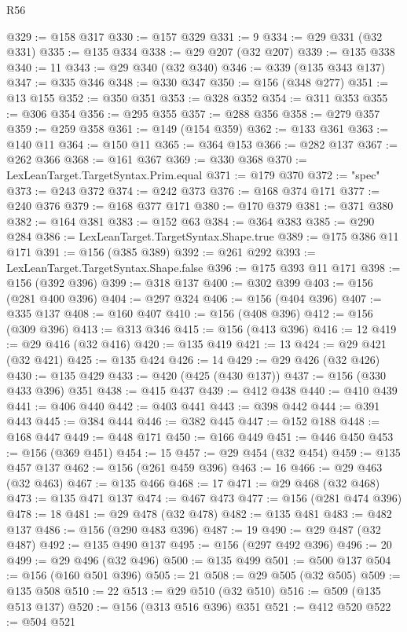 \begin{lexlean}{R56}
\begin{coremodule}
{{{{{{{{{{{{{{{{{{{{{{{{{{{{{{{{{{{{{{{{{{{{{{{{{{{{{{{{{{{{{{{{{{{{{{{{{{{{{{{{{{{{{{{{{{{{{{{{{{{{{{{{{{{{{{{{{{{{{{{{{{{{{{{{{{{{{{{{{{{{{{{{{{{{{{{{{{{{{{{{{{{{{{{{{{{{{{{{{{{{{{{{{{{{{{{{{{{{{{{{{{{{{{{{{{{@329 := @158 @317
@330 := @157 @329
@331 := 9
@334 := @29 @331 (@32 @331)
@335 := @135 @334
@338 := @29 @207 (@32 @207)
@339 := @135 @338
@340 := 11
@343 := @29 @340 (@32 @340)
@346 := @339 (@135 @343 @137)
@347 := @335 @346
@348 := @330 @347
@350 := @156 (@348 @277)
@351 := @13 @155
@352 := @350 @351
@353 := @328 @352
@354 := @311 @353
@355 := @306 @354
@356 := @295 @355
@357 := @288 @356
@358 := @279 @357
@359 := @259 @358
@361 := @149 (@154 @359)
@362 := @133 @361
@363 := @140 @11
@364 := @150 @11
@365 := @364 @153
@366 := @282 @137
@367 := @262 @366
@368 := @161 @367
@369 := @330 @368
@370 := LexLeanTarget.TargetSyntax.Prim.equal
@371 := @179 @370
@372 := "spec"
@373 := @243 @372
@374 := @242 @373
@376 := @168 @374 @171
@377 := @240 @376
@379 := @168 @377 @171
@380 := @170 @379
@381 := @371 @380
@382 := @164 @381
@383 := @152 @63
@384 := @364 @383
@385 := @290 @284
@386 := LexLeanTarget.TargetSyntax.Shape.true
@389 := @175 @386 @11 @171
@391 := @156 (@385 @389)
@392 := @261 @292
@393 := LexLeanTarget.TargetSyntax.Shape.false
@396 := @175 @393 @11 @171
@398 := @156 (@392 @396)
@399 := @318 @137
@400 := @302 @399
@403 := @156 (@281 @400 @396)
@404 := @297 @324
@406 := @156 (@404 @396)
@407 := @335 @137
@408 := @160 @407
@410 := @156 (@408 @396)
@412 := @156 (@309 @396)
@413 := @313 @346
@415 := @156 (@413 @396)
@416 := 12
@419 := @29 @416 (@32 @416)
@420 := @135 @419
@421 := 13
@424 := @29 @421 (@32 @421)
@425 := @135 @424
@426 := 14
@429 := @29 @426 (@32 @426)
@430 := @135 @429
@433 := @420 (@425 (@430 @137))
@437 := @156 (@330 @433 @396) @351
@438 := @415 @437
@439 := @412 @438
@440 := @410 @439
@441 := @406 @440
@442 := @403 @441
@443 := @398 @442
@444 := @391 @443
@445 := @384 @444
@446 := @382 @445
@447 := @152 @188
@448 := @168 @447
@449 := @448 @171
@450 := @166 @449
@451 := @446 @450
@453 := @156 (@369 @451)
@454 := 15
@457 := @29 @454 (@32 @454)
@459 := @135 @457 @137
@462 := @156 (@261 @459 @396)
@463 := 16
@466 := @29 @463 (@32 @463)
@467 := @135 @466
@468 := 17
@471 := @29 @468 (@32 @468)
@473 := @135 @471 @137
@474 := @467 @473
@477 := @156 (@281 @474 @396)
@478 := 18
@481 := @29 @478 (@32 @478)
@482 := @135 @481
@483 := @482 @137
@486 := @156 (@290 @483 @396)
@487 := 19
@490 := @29 @487 (@32 @487)
@492 := @135 @490 @137
@495 := @156 (@297 @492 @396)
@496 := 20
@499 := @29 @496 (@32 @496)
@500 := @135 @499
@501 := @500 @137
@504 := @156 (@160 @501 @396)
@505 := 21
@508 := @29 @505 (@32 @505)
@509 := @135 @508
@510 := 22
@513 := @29 @510 (@32 @510)
@516 := @509 (@135 @513 @137)
@520 := @156 (@313 @516 @396) @351
@521 := @412 @520
@522 := @504 @521
}}}}}}}}}}}}}}}}}}}}}}}}}}}}}}}}}}}}}}}}}}}}}}}}}}}}}}}}}}}}}}}}}}}}}}}}}}}}}}}}}}}}}}}}}}}}}}}}}}}}}}}}}}}}}}}}}}}}}}}}}}}}}}}}}}}}}}}}}}}}}}}}}}}}}}}}}}}}}}}}}}}}}}}}}}}}}}}}}}}}}}}}}}}}}}}}}}}}}}}}}}}}}}}}}}}
\end{coremodule}
\end{lexlean}

